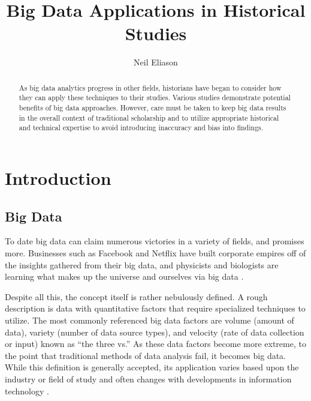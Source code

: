 \documentclass[sigconf]{acmart}
\begin{document}
\title{Big Data Applications in Historical Studies}


\author{Neil Eliason}

\renewcommand{\shortauthors}{N. Eliason}


\begin{abstract}

As big data analytics progress in other fields, historians have began to consider how they can apply these techniques to their studies. Various studies demonstrate potential benefits of big data approaches. However, care must be taken to keep big data results in the overall context of traditional scholarship and to utilize appropriate historical and technical expertise to avoid introducing inaccuracy and bias into findings.

\end{abstract}



\maketitle



\section{Introduction}

\subsection{Big Data}


To date big data can claim numerous victories in a variety of fields, and promises more. Businesses such as Facebook and Netflix have built corporate empires off of the insights gathered from their big data, and physicists and biologists are learning what makes up the universe and ourselves via big data \cite{bdsurvey}. 

Despite all this, the concept itself is rather nebulously defined. A rough description is data with quantitative factors that require specialized techniques to utilize. The most commonly referenced big data factors are volume (amount of data), variety (number of data source types), and velocity (rate of data collection or input) known as ``the three vs.'' As these data factors become more extreme, to the point that traditional methods of data analysis fail, it becomes big data. While this definition is generally accepted, its application varies based upon the industry or field of study and often changes with developments in information technology \cite{bdconcepts}.
\end{document}
